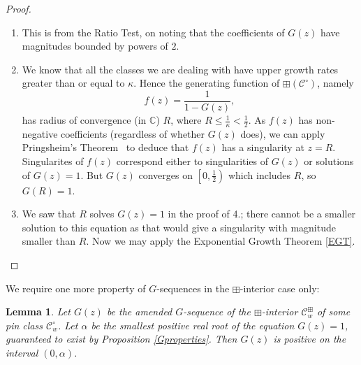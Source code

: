 \documentclass[11pt,a4paper]{article}
\newtheorem{lemma}[thm]{Lemma}
\theoremstyle{definition}
\begin{document}
\begin{proof}
\begin{enumerate}
\item This is from the Ratio Test, on noting that the coefficients of $G(z)$ have magnitudes bounded by powers of $2$.

\item We know that all the classes we are dealing with have upper growth rates greater than or equal to $\kappa$. Hence the generating function of $\boxplus\left(\mathcal{C}^{\circ}\right)$, namely
\[
f(z) = \frac{1}{1 - G(z)} ,
\]
has radius of convergence (in $\mathbb{C}$) $R$, where $R \leq \frac{1}{\kappa} < \frac{1}{2}$. As $f(z)$ has non-negative coefficients (regardless of whether $G(z)$ does), we can apply Pringsheim's Theorem~\cite[Theorem IV.7]{flajolet:analytic-combin:} to deduce that $f(z)$ has a singularity at $z = R$. Singularites of $f(z)$ correspond either to singularities of $G(z)$ or solutions of $G(z)=1$. But $G(z)$ converges on $\left[0,\frac{1}{2}\right)$ which includes $R$, so $G(R)=1$.

\item We saw that $R$ solves $G(z)=1$ in the proof of 4.; there cannot be a smaller solution to this equation as that would give a singularity with magnitude smaller than $R$. Now we may apply the Exponential Growth Theorem \ref{EGT}. \qedhere
\end{enumerate}
\end{proof}

We require one more property of $G$-sequences in the $\boxplus$-interior case only:

\begin{lemma} \label{G+}
Let $G(z)$ be the amended $G$-sequence of the $\boxplus$-interior $\mathcal{C}^{\boxplus}_{w}$ of some pin class $\mathcal{C}^{\circ}_{w}$. Let $\alpha$ be the smallest positive real root of the equation $G(z)=1$, guaranteed to exist by Proposition \ref{Gproperties}. Then $G(z)$ is positive on the interval $(0,\alpha)$.
\end{lemma}
\end{document}
